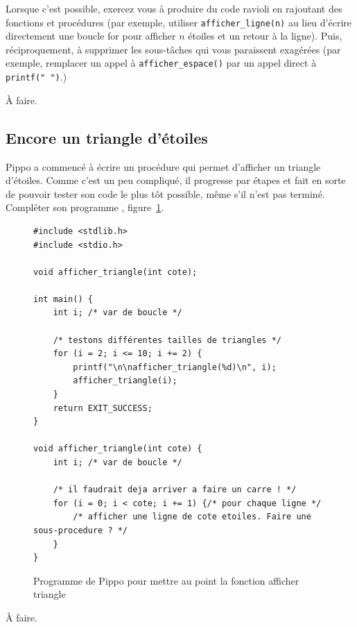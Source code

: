 Lorsque c'est possible, exercez vous à produire du code ravioli en
rajoutant des fonctions et procédures (par exemple, utiliser
\verb+afficher_ligne(n)+ au lieu d'écrire directement une boucle for
pour afficher $n$ étoiles et un retour à la ligne). Puis,
réciproquement, à supprimer les sous-tâches qui vous paraissent
exagérées (par exemple, remplacer un appel à \verb+afficher_espace()+
par un appel direct à \verb+printf(" ")+.)

\begin{correction}
À faire.
\end{correction}

\subsection{Encore un triangle d'étoiles}
Pippo a commencé à écrire un procédure qui permet d'afficher un
triangle d'étoiles. Comme c'est un peu compliqué, il progresse par étapes
et fait en sorte de pouvoir tester son code le plus tôt possible, même
s'il n'est pas terminé.  Compléter son programme , figure~\ref{fig:triangle}.

\begin{figure}[tb]
  \begin{small}
\begin{verbatim}
#include <stdlib.h>
#include <stdio.h>

void afficher_triangle(int cote);

int main() {
    int i; /* var de boucle */

    /* testons différentes tailles de triangles */
    for (i = 2; i <= 10; i += 2) {
        printf("\n\nafficher_triangle(%d)\n", i);
        afficher_triangle(i);
    }
    return EXIT_SUCCESS;
}

void afficher_triangle(int cote) {
    int i; /* var de boucle */

    /* il faudrait deja arriver a faire un carre ! */
    for (i = 0; i < cote; i += 1) {/* pour chaque ligne */
        /* afficher une ligne de cote etoiles. Faire une sous-procedure ? */
    }
}
\end{verbatim}
\vspace{-0.5cm}
  \end{small}
  \caption{Programme de Pippo pour mettre au point la fonction afficher triangle}
\label{fig:triangle}
\end{figure}

\begin{correction}
À faire.
\end{correction}


